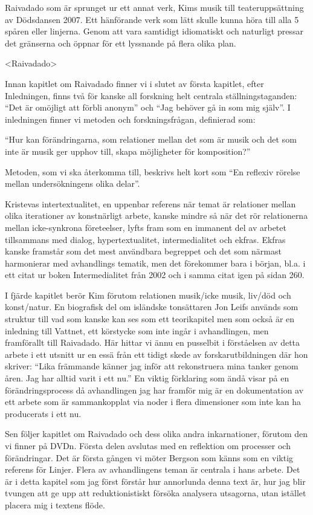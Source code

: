 \documentclass{article}
\begin{document}
Raivadado som är sprunget ur ett annat verk, Kims musik till teateruppsättning av Dödsdansen 2007. Ett hänförande verk som lätt skulle kunna höra till alla 5 spåren eller linjerna. Genom att vara samtidigt idiomatiskt och naturligt pressar det gränserna och öppnar för ett lyssnande på flera olika plan.

\textless{}Raivadado\textgreater{}

Innan kapitlet om Raivadado finner vi i slutet av första kapitlet, efter Inledningen, finns två för kanske all forskning helt centrala ställningstaganden: ``Det är omöjligt att förbli anonym'' och ``Jag behöver gå in som mig själv''. I inledningen finner vi metoden och forskningsfrågan, definierad som:

``Hur kan förändringarna, som relationer mellan det som är musik och det som inte är musik ger upphov till, skapa möjligheter för komposition?''

Metoden, som vi ska återkomma till, beskrivs helt kort som ``En reflexiv rörelse mellan undersökningens olika delar''.

Kristevas intertextualitet, en uppenbar referens när temat är relationer mellan olika iterationer av konstnärligt arbete, kanske mindre så när det rör relationerna mellan icke-synkrona företeelser, lyfts fram som en immanent del av arbetet tillsammans med dialog, hypertextualitet, intermedialitet och ekfras. Ekfras kanske framstår som det mest användbara begreppet och det som närmast harmonierar med avhandlings tematik, men det förekommer bara i början, bl.a. i ett citat ur boken Intermedialitet från 2002 och i samma citat igen på sidan 260.

I fjärde kapitlet berör Kim förutom relationen musik/icke musik, liv/död och konst/natur. En biografisk del om isländske tonsättaren Jon Leifs används som struktur till vad som kanske kan ses som ett teorikapitel men som också är en inledning till Vattnet, ett körstycke som inte ingår i avhandlingen, men framförallt till Raivadado. Här hittar vi ännu en pusselbit i förståelsen av detta arbete i ett utsnitt ur en essä från ett tidigt skede av forskarutbildningen där hon skriver: ``Lika främmande känner jag inför att rekonstruera mina tanker genom åren. Jag har alltid varit i ett nu.'' En viktig förklaring som ändå visar på en förändringsprocess då avhandlingen jag har framför mig är en dokumentation av ett arbete som är sammankopplat via noder i flera dimensioner som inte kan ha producerats i ett nu.

Sen följer kapitlet om Raivadado och dess olika andra inkarnationer, förutom den vi finner på DVDn. Första delen avslutas med en reflektion om processer och förändringar. Det är första gången vi möter Bergson som känns som en viktig referens för Linjer. Flera av avhandlingens teman är centrala i hans arbete. Det är i detta kapitel som jag först förstår hur annorlunda denna text är, hur jag blir tvungen att ge upp att reduktionistiskt försöka analysera utsagorna, utan istället placera mig i textens flöde.
\end{document}
